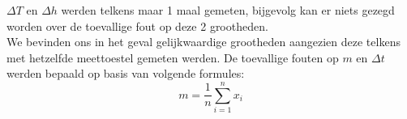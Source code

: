 
$\Delta T$ en $\Delta h$ werden telkens maar 1 maal gemeten, bijgevolg kan er niets gezegd worden over de toevallige fout op deze 2 grootheden.
\\
We bevinden ons in het geval gelijkwaardige grootheden aangezien deze telkens met hetzelfde meettoestel gemeten werden.
De toevallige fouten op $m$ en $\Delta t$ werden bepaald op basis van volgende formules:
\begin{equation}
    m = \frac{1}{n} \sum\limits_{i=1}^n x_i
\end{equation}


